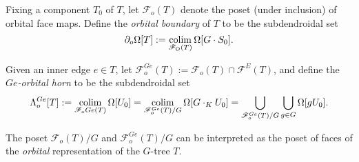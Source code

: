 \documentclass[a4paper,10pt,draft]{article}%
\begin{document}
\begin{definition}
      Fixing a component $T_0$ of $T$,
      let $\mathscr{F}_{o}(T)$ denote the poset (under inclusion) of orbital face maps.
      Define the \textit{orbital boundary} of $T$ to be the subdendroidal set
      \begin{equation}
            \partial_{o}\Omega[T] := \mathop{\operatorname{colim}}\limits_{\mathscr{F}_{\mathrm{O}}(T)}\Omega[G \cdot S_0].
      \end{equation}
      
      Given an inner edge $e \in T$, let
      $\mathscr{F}_{o}^{Ge}(T) := \mathscr{F}_{o}(T) \cap \mathscr{F}^E(T)$,
      and define the \textit{$Ge$-orbital horn} to be the subdendroidal set
      \begin{equation}
            \Lambda^{Ge}_{o}[T] :=
            \mathop{\operatorname{colim}}\limits_{\mathscr{F}_o{Ge}(T)}\Omega[U_0]
            = \mathop{\operatorname{colim}}\limits_{\mathscr{F}_{o}^{Ge}(T)/G}\Omega[G\cdot_K U_0]
            = \mathop{\bigcup}\limits_{\mathscr{F}_o^{Ge}(T)/G} \mathop{\bigcup}\limits_{g \in G}\Omega[g U_0]. 
      \end{equation}
\end{definition}


\begin{remark}
      The poset $\mathscr{F}_o(T)/G$ and $\mathscr{F}_o^{G e}(T)/G$ can be interpreted as
      the poset of faces of the \textit{orbital} representation of the $G$-tree $T$.
\end{remark}
\end{document}
